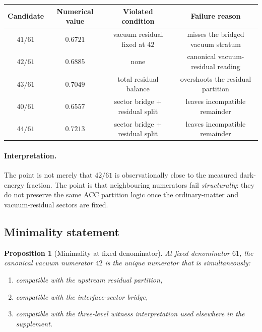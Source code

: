 \documentclass[11pt]{article}
\theoremstyle{plain}
\newtheorem{proposition}[theorem]{Proposition}
\theoremstyle{definition}
\theoremstyle{remark}
\begin{document}
\begin{center}
\begin{tabular}{@{}cccc@{}}
\toprule
Candidate & Numerical value & Violated condition & Failure reason \\
\midrule
$41/61$ & $0.6721$ & vacuum residual fixed at $42$ & misses the bridged vacuum stratum \\
$42/61$ & $0.6885$ & none & canonical vacuum-residual reading \\
$43/61$ & $0.7049$ & total residual balance & overshoots the residual partition \\
$40/61$ & $0.6557$ & sector bridge + residual split & leaves incompatible remainder \\
$44/61$ & $0.7213$ & sector bridge + residual split & leaves incompatible remainder \\
\bottomrule
\end{tabular}
\end{center}

\paragraph{Interpretation.}
The point is not merely that $42/61$ is observationally close to the measured dark-energy fraction.  The point is that neighbouring numerators fail \emph{structurally}: they do not preserve the same ACC partition logic once the ordinary-matter and vacuum-residual sectors are fixed.

\bigskip

\subsection{Minimality statement}\label{supp:I3}

\begin{proposition}[Minimality at fixed denominator]\label{prop:minimality_61}
At fixed denominator $61$, the canonical vacuum numerator $42$ is the unique numerator that is simultaneously:
\begin{enumerate}[leftmargin=2.5em,label=\textup{(\roman*)}]
  \item compatible with the upstream residual partition,
  \item compatible with the interface-sector bridge,
  \item compatible with the three-level witness interpretation used elsewhere in the supplement.
\end{enumerate}
\end{proposition}
\end{document}
